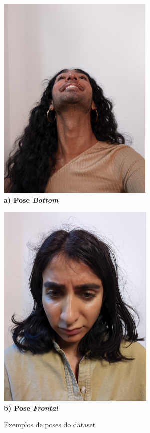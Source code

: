 \begin{figure}[h!]
\caption{Exemplos de poses do dataset}
    \label{fig: poses}
    \begin{minipage}[!]{0.55\linewidth}
    \includegraphics[height=10cm]{Template_Latex_TCC-UNIFTEC/_lib/imagens/bottom.jpg}\\ \centering\textbf{ a) Pose \textit{Bottom}}
    \label{fig: bottom}
    \end{minipage}
    \begin{minipage}[!]{0.55\linewidth}
    \includegraphics[height=10cm]{Template_Latex_TCC-UNIFTEC/_lib/imagens/frontal.jpg}\\ \centering\textbf{ b) Pose \textit{Frontal}}
    \label{fig: frontal}
    \end{minipage}

\end{figure}
